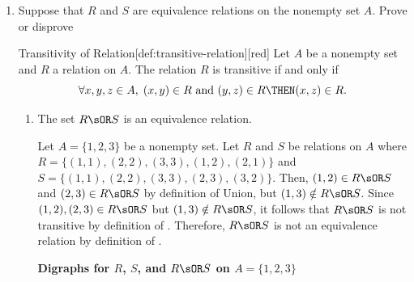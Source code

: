 \begin{enumerate}
  \item Suppose that $R$ and $S$ are equivalence relations on the nonempty set $A$. Prove or disprove
  \begin{define}{Transitivity of Relation}[def:transitive-relation][red]
    Let $A$ be a nonempty set and $R$ a relation on $A$. The relation $R$ is transitive if and only if
    \[
      \forall x, y, z \in A,\; (x, y) \in R \text{ and } (y, z) \in R \THEN (x, z) \in R.
    \]
  \end{define}
  \begin{enumerate}
    \item The set $R \sOR S$ is an equivalence relation.
      \begin{subdisprove}
        Let $A = \{1,2,3\}$ be a nonempty set. Let $R$ and $S$ be relations on $A$ where
        $R = \{(1,1),(2,2),(3,3),(1,2),(2,1)\}$ and
        $S = \{(1,1),(2,2),(3,3),(2,3),(3,2)\}$. 
        Then, $(1,2) \in R \sOR S$ and $(2,3) \in R \sOR S$ by definition of Union, 
        but $(1,3) \notin R \sOR S$. 
        Since $(1,2), (2,3) \in R \sOR S$ but $(1,3) \notin R \sOR S$, 
        it follows that $R \sOR S$ is not transitive by definition of .
        Therefore, $R \sOR S$ is not an equivalence relation by definition of .
        \begin{center}
        \textbf{Digraphs for $R$, $S$, and $R \sOR S$ on $A = \{1,2,3\}$}
        \newline
        \hspace{1cm}
\end{center}
\end{subdisprove}
\end{enumerate}
\end{enumerate}
